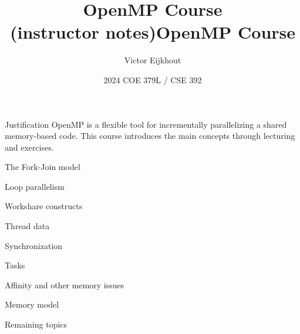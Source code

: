 \documentclass[10pt]{beamer}
\begin{document}
\author[Eijkhout]{Victor Eijkhout}
\date[2024]{2024 COE 379L / CSE 392}
\ifisinstructor
  \title[OMP]{OpenMP Course\\ (instructor notes)}
\else
  \title[OMP]{OpenMP Course}
\fi
\maketitle

\begin{frame}{Justification}
  OpenMP is a flexible tool for incrementally parallelizing a shared
  memory-based code.
  This course introduces the main concepts
  through lecturing and exercises.
\end{frame}

 {The Fork-Join model}


 {Loop parallelism}


 {Workshare constructs}


 {Thread data}


 {Synchronization}


 {Tasks}


 {Affinity and other memory issues}


 {Memory model}


 {Remaining topics}

\end{document}
